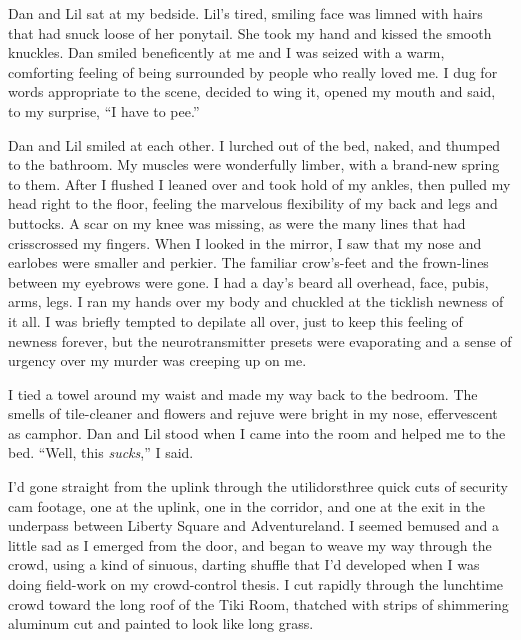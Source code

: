 Dan and Lil sat at my bedside. Lil's tired, smiling face was limned
with hairs that had snuck loose of her ponytail. She took my hand
and kissed the smooth knuckles. Dan smiled beneficently at me and I
was seized with a warm, comforting feeling of being surrounded by
people who really loved me. I dug for words appropriate to the
scene, decided to wing it, opened my mouth and said, to my
surprise, “I have to pee.”

Dan and Lil smiled at each other. I lurched out of the bed, naked,
and thumped to the bathroom. My muscles were wonderfully limber,
with a brand-new spring to them. After I flushed I leaned over and
took hold of my ankles, then pulled my head right to the floor,
feeling the marvelous flexibility of my back and legs and buttocks.
A scar on my knee was missing, as were the many lines that had
crisscrossed my fingers. When I looked in the mirror, I saw that my
nose and earlobes were smaller and perkier. The familiar
crow's-feet and the frown-lines between my eyebrows were gone. I
had a day's beard all over{\dash}head, face, pubis, arms, legs. I ran my
hands over my body and chuckled at the ticklish newness of it all.
I was briefly tempted to depilate all over, just to keep this
feeling of newness forever, but the neurotransmitter presets were
evaporating and a sense of urgency over my murder was creeping up
on me.

I tied a towel around my waist and made my way back to the bedroom.
The smells of tile-cleaner and flowers and rejuve were bright in my
nose, effervescent as camphor. Dan and Lil stood when I came into
the room and helped me to the bed. “Well, this \emph{sucks},” I
said.

I'd gone straight from the uplink through the utilidors{\dash}three quick
cuts of security cam footage, one at the uplink, one in the
corridor, and one at the exit in the underpass between Liberty
Square and Adventureland. I seemed bemused and a little sad as I
emerged from the door, and began to weave my way through the crowd,
using a kind of sinuous, darting shuffle that I'd developed when I
was doing field-work on my crowd-control thesis. I cut rapidly
through the lunchtime crowd toward the long roof of the Tiki Room,
thatched with strips of shimmering aluminum cut and painted to look
like long grass.


